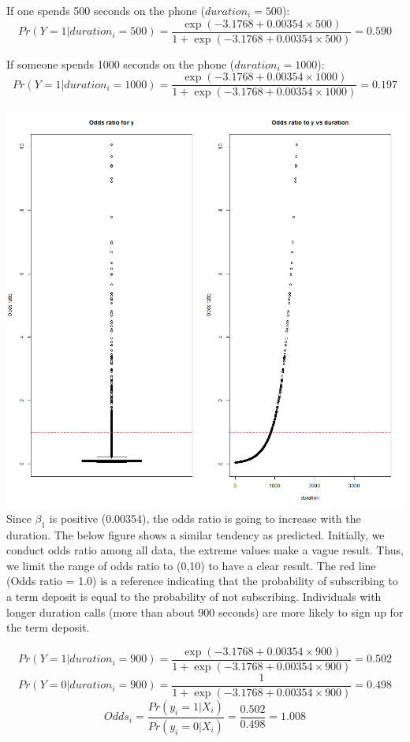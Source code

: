 \documentclass[11pt]{article}
\begin{document}
{If one spends 500 seconds on the phone ($duration_i=500$):
$$Pr(Y=1|duration_i = 500) = \frac{\exp(-3.1768+0.00354 \times 500)}{1+\exp(-3.1768+0.00354 \times 500)} = 0.590$$

If someone spends 1000 seconds on the phone ($duration_i=1000$):
$$Pr(Y=1|duration_i = 1000) = \frac{\exp(-3.1768+0.00354 \times 1000)}{1+\exp(-3.1768+0.00354 \times 1000)} = 0.197$$

\includegraphics[scale=0.45]{Odds}\\

Since $\beta_1$ is positive (0.00354), the odds ratio is going to increase with the duration. The below figure shows a similar tendency as predicted. Initially, we conduct odds ratio among all data, the extreme values make a vague result. Thus, we limit the range of odds ratio to (0,10) to have a clear result. The red line (Odds ratio = 1.0) is a reference indicating that the probability of subscribing to a term deposit is equal to the probability of not subscribing. Individuals with longer duration calls (more than about 900 seconds) are more likely to sign up for the term deposit.  

$$Pr(Y=1|duration_i = 900) = \frac{\exp(-3.1768+0.00354 \times 900)}{1+\exp(-3.1768+0.00354 \times 900)} = 0.502$$
$$Pr(Y=0|duration_i = 900) = \frac{1}{1+\exp(-3.1768+0.00354 \times 900)} = 0.498$$
$$Odds_i = \frac{Pr(y_i=1|X_i)}{Pr(y_i=0|X_i)} = \frac{0.502}{0.498} = 1.008$$

}
\end{document}
